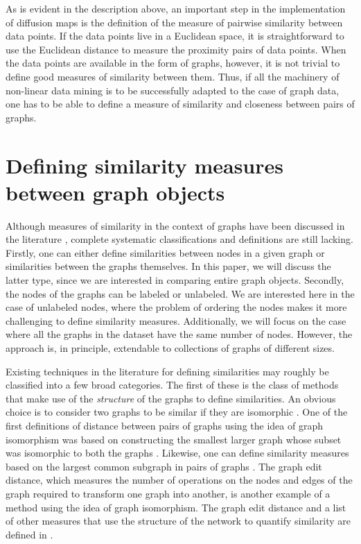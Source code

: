 As is evident in the description above, an important step in the
implementation of diffusion maps is the definition of the measure of
pairwise similarity between data points.
% 
If the data points live in a Euclidean space, it is straightforward to
use the Euclidean distance to measure the proximity pairs of data
points.
% 
When the data points are available in the form of graphs, however, it
is not trivial to define good measures of similarity between them.
% 
Thus, if all the machinery of non-linear data mining is to be
successfully adapted to the case of graph data, one has to be able to
define a measure of similarity and closeness between pairs of graphs.

\section{\label{sec:sim} Defining similarity measures between graph
  objects}

Although measures of similarity in the context of graphs have been
discussed in the literature \cite{Dana11algorithms}, complete
systematic classifications and definitions are still lacking.
% 
Firstly, one can either define similarities between nodes in a given
graph or similarities between the graphs themselves.
% 
In this paper, we will discuss the latter type, since we are
interested in comparing entire graph objects.
% 
Secondly, the nodes of the graphs can be labeled or unlabeled.
% 
We are interested here in the case of unlabeled nodes, where the
problem of ordering the nodes makes it more challenging to define
similarity measures.
% 
Additionally, we will focus on the case where all the graphs in the
dataset have the same number of nodes.
% 
However, the approach is, in principle, extendable to collections of
graphs of different sizes.
% 

Existing techniques in the literature for defining similarities may
roughly be classified into a few broad categories.
% 
The first of these is the class of methods that make use of the {\em
  structure} of the graphs to define similarities.
% 
% 
An obvious choice is to consider two graphs to be similar if they are
isomorphic \cite{Peli98replicator}.
% 
One of the first definitions of distance between pairs of graphs using
the idea of graph isomorphism was based on constructing the smallest
larger graph whose subset was isomorphic to both the graphs
\cite{Zeli75certain}.
% 
Likewise, one can define similarity measures based on the largest
common subgraph in pairs of graphs \cite{Bunk98graph,Raym02rascal:}.
% 
The graph edit distance, which measures the number of operations on
the nodes and edges of the graph required to transform one graph into
another, is another example of a method using the idea of graph
isomorphism.
% 
The graph edit distance and a list of other measures that use the
structure of the network to quantify similarity are defined in
\cite{Papa08web}.


